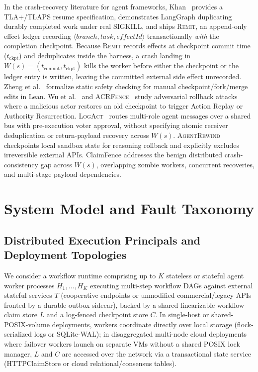 \documentclass[10pt,journal]{IEEEtran}
\def\CF{ClaimFence}%
\def\texttt#1{#1}%
\theoremstyle{definition}
\theoremstyle{remark}
\newcommand{\CF}{\textsc{ClaimFence}}
\begin{document}
In the crash-recovery literature for agent frameworks, Khan~\cite{khan2026resume} provides a TLA+/TLAPS resume specification, demonstrates \texttt{LangGraph} duplicating durably completed work under real \texttt{SIGKILL}, and ships \textsc{Remit}, an append-only effect ledger recording $\langle\mathit{branch}, \mathit{task}, \mathit{effectId}\rangle$ transactionally \emph{with} the completion checkpoint. Because \textsc{Remit} records effects at checkpoint commit time ($t_{\mathrm{ckpt}}$) and deduplicates inside the harness, a crash landing in $W(s) = (t_{\mathrm{commit}}, t_{\mathrm{ckpt}})$ kills the worker before either the checkpoint or the ledger entry is written, leaving the committed external side effect unrecorded. Zheng et al.~\cite{zheng2026checkpoint} formalize static safety checking for manual checkpoint/fork/merge edits in Lean. Wu et al.~\cite{safetoresume2026} and \textsc{ACRFence}~\cite{acrfence2026} study adversarial rollback attacks where a malicious actor restores an old checkpoint to trigger Action Replay or Authority Resurrection. \textsc{LogAct}~\cite{logact2026} routes multi-role agent messages over a shared bus with pre-execution voter approval, without specifying atomic receiver deduplication or return-payload recovery across $W(s)$. \textsc{AgentRewind}~\cite{agentrewind2026} checkpoints local sandbox state for reasoning rollback and explicitly excludes irreversible external APIs. \CF{} addresses the benign distributed crash-consistency gap across $W(s)$, overlapping zombie workers, concurrent recoveries, and multi-stage payload dependencies.

\section{System Model and Fault Taxonomy}\label{sec:model}

\subsection{Distributed Execution Principals and Deployment Topologies}
We consider a workflow runtime comprising up to $K$ stateless or stateful agent worker processes $H_1, \dots, H_K$ executing multi-step workflow DAGs against external stateful services $T$ (cooperative endpoints or unmodified commercial/legacy APIs fronted by a durable outbox sidecar), backed by a shared linearizable workflow claim store $L$ and a log-fenced checkpoint store $C$. In single-host or shared-POSIX-volume deployments, workers coordinate directly over local storage (\texttt{flock}-serialized logs or \texttt{SQLite-WAL}); in disaggregated multi-node cloud deployments where failover workers launch on separate VMs without a shared POSIX lock manager, $L$ and $C$ are accessed over the network via a transactional state service (\texttt{HTTPClaimStore} or cloud relational/consensus tables).
\end{document}
